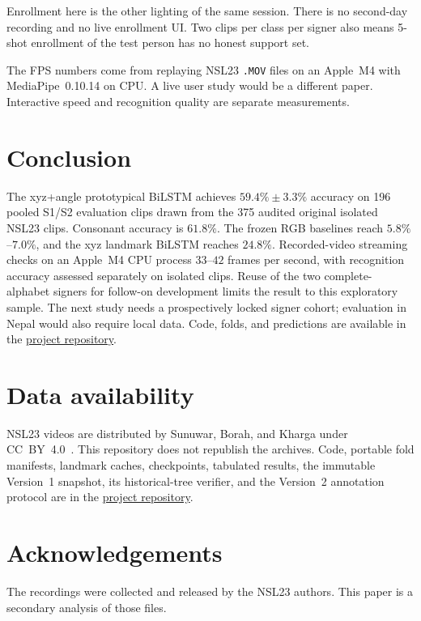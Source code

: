 \documentclass[11pt,a4paper]{article}
\begin{document}
Enrollment here is the other lighting of the same session. There is no second-day recording and no live enrollment UI. Two clips per class per signer also means 5-shot enrollment of the test person has no honest support set.

The FPS numbers come from replaying NSL23 \texttt{.MOV} files on an Apple~M4 with MediaPipe~0.10.14 on CPU. A live user study would be a different paper. Interactive speed and recognition quality are separate measurements.

\section{Conclusion}

The xyz+angle prototypical BiLSTM achieves $59.4\% \pm 3.3\%$ accuracy on 196 pooled S1/S2 evaluation clips drawn from the 375 audited original isolated NSL23 clips. Consonant accuracy is $61.8\%$. The frozen RGB baselines reach $5.8\%$--$7.0\%$, and the xyz landmark BiLSTM reaches $24.8\%$. Recorded-video streaming checks on an Apple~M4 CPU process $33$--$42$ frames per second, with recognition accuracy assessed separately on isolated clips. Reuse of the two complete-alphabet signers for follow-on development limits the result to this exploratory sample. The next study needs a prospectively locked signer cohort; evaluation in Nepal would also require local data. Code, folds, and predictions are available in the \href{https://github.com/twasanon/nsl23-low-resource-alphabet}{project repository}.

\section*{Data availability}

NSL23 videos are distributed by Sunuwar, Borah, and Kharga under CC~BY~4.0~\cite{sunuwar2023zenodo,sunuwar2024nsl23}. This repository does not republish the archives. Code, portable fold manifests, landmark caches, checkpoints, tabulated results, the immutable Version~1 snapshot, its historical-tree verifier, and the Version~2 annotation protocol are in the \href{https://github.com/twasanon/nsl23-low-resource-alphabet}{project repository}.

\section*{Acknowledgements}

The recordings were collected and released by the NSL23 authors. This paper is a secondary analysis of those files.

\begingroup
\small
\singlespacing


\endgroup
\end{document}

